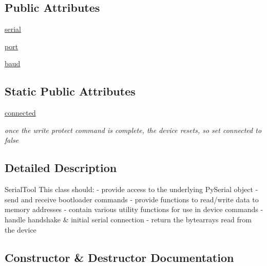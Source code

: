 \subsection*{Public Attributes}
\begin{DoxyCompactItemize}
\item 
\hyperlink{classstm__tools_1_1serialflasher_1_1serialtool_1_1SerialTool_afae8c8266de12daf134ef2bf3a869f65}{serial}
\item 
\hyperlink{classstm__tools_1_1serialflasher_1_1serialtool_1_1SerialTool_af8fb0f45ee0195c7422a49e6a8d72369}{port}
\item 
\hyperlink{classstm__tools_1_1serialflasher_1_1serialtool_1_1SerialTool_a76432121357072730f76c1bf26df93ec}{baud}
\end{DoxyCompactItemize}
\subsection*{Static Public Attributes}
\begin{DoxyCompactItemize}
\item 
\hyperlink{classstm__tools_1_1serialflasher_1_1serialtool_1_1SerialTool_a0d28f70b9b7238e7de23f1128d858d39}{connected}
\begin{DoxyCompactList}\small\item\em once the write protect command is complete, the device resets, so set connected to false \end{DoxyCompactList}\end{DoxyCompactItemize}


\subsection{Detailed Description}
\begin{DoxyVerb}SerialTool
    This class should:
- provide access to the underlying PySerial object
- send and receive bootloader commands
- provide functions to read/write data to memory addresses
- contain various utility functions for use in device commands
- handle handshake & initial serial connection
- return the bytearrays read from the device\end{DoxyVerb}
 

\subsection{Constructor \& Destructor Documentation}
\mbox{\label{classstm__tools_1_1serialflasher_1_1serialtool_1_1SerialTool_ac775ee34451fdfa742b318538164070e}} 
